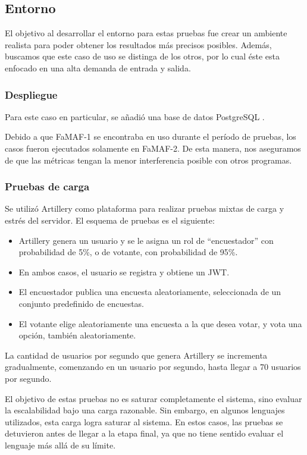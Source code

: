\documentclass[11pt]{article}
\let\Oldsubsection\subsection
\renewcommand{\subsection}{\FloatBarrier\Oldsubsection}
\let\Oldsubsubsection\subsubsection
\renewcommand{\subsubsection}{\FloatBarrier\Oldsubsubsection}
\begin{document}
\subsection{Entorno}

El objetivo al desarrollar el entorno para estas pruebas fue crear un ambiente realista para poder obtener los resultados más precisos posibles. Además, buscamos que este caso de uso se distinga de los otros, por lo cual éste esta enfocado en una alta demanda de entrada y salida.

\subsubsection{Despliegue}

Para este caso en particular, se añadió una base de datos PostgreSQL \cite{http:postgresql}.

Debido a que FaMAF-1 se encontraba en uso durante el período de pruebas, los casos fueron ejecutados solamente en FaMAF-2. De esta manera, nos aseguramos de que las métricas tengan la menor interferencia posible con otros programas.

\subsubsection{Pruebas de carga}

Se utilizó Artillery \cite{http:artillery} como plataforma para realizar pruebas mixtas de carga y estrés del servidor. El esquema de pruebas es el siguiente:

\begin{itemize}
    \item Artillery genera un usuario y se le asigna un rol de “encuestador” con probabilidad de 5\%, o de votante, con probabilidad de 95\%.
    \item En ambos casos, el usuario se registra y obtiene un JWT.
    \item El encuestador publica una encuesta aleatoriamente, seleccionada de un conjunto predefinido de encuestas.
    \item El votante elige aleatoriamente una encuesta a la que desea votar, y vota una opción, también aleatoriamente.
\end{itemize}

La cantidad de usuarios por segundo que genera Artillery se incrementa gradualmente, comenzando en un usuario por segundo, hasta llegar a 70 usuarios por segundo.

El objetivo de estas pruebas no es saturar completamente el sistema, sino evaluar la escalabilidad bajo una carga razonable. Sin embargo, en algunos lenguajes utilizados, esta carga logra saturar al sistema. En estos casos, las pruebas se detuvieron antes de llegar a la etapa final, ya que no tiene sentido evaluar el lenguaje más allá de su límite.
\end{document}
